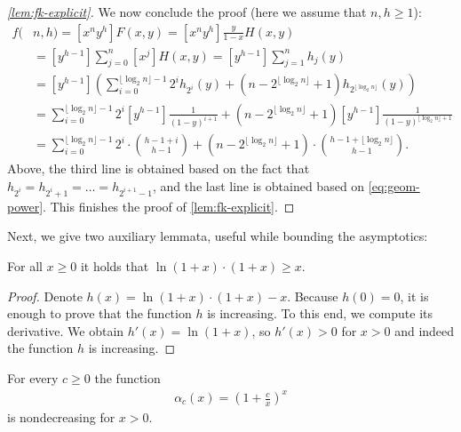 \documentclass[envcountsect,envcountsame]{llncs}
\newcommand{\fk}{f}
\newcommand{\Fk}{F}
\begin{document}
\begin{proof}[\cref{lem:fk-explicit}]
		We now conclude the proof (here we assume that $n,h\geq 1$):
		\begin{align*}
			\fk(&n, h)  = [x^n y^h] \Fk(x, y) = [x^n y^h] \frac{y}{1 - x} H(x, y)\\
			& = [y^{h - 1}] \sum_{j = 0}^n [x^j] H(x, y) = [y^{h - 1}] \sum_{j = 1}^n h_j(y)\\
			& = [y^{h - 1}] \left( \sum_{i = 0}^{\lfloor \log_2 n \rfloor - 1} 2^i h_{2^i}(y) + (n - 2^{\lfloor \log_2 n \rfloor} + 1)  h_{2^{\lfloor \log_2 n \rfloor}}(y) \right)\\
			& = \sum_{i = 0}^{\lfloor \log_2 n \rfloor - 1} 2^i [y^{h - 1}] \frac{1}{(1 - y)^{i + 1}}
				+ (n - 2^{\lfloor \log_2 n \rfloor} + 1) [y^{h - 1}] \frac{1}{(1 - y)^{\lfloor \log_2 n \rfloor + 1}}\\
			& = \sum_{i = 0}^{\lfloor \log_2 n \rfloor - 1} 2^i\cdot\binom{h - 1 + i}{h - 1} + (n - 2^{\lfloor \log_2 n \rfloor} + 1)\cdot\binom{h - 1 + \lfloor \log_2 n \rfloor}{h - 1}.
		\end{align*}
		Above, the third line is obtained based on the fact that $h_{2^i} = h_{2^i + 1} = \ldots = h_{2^{i + 1} - 1}$,
		and the last line is obtained based on \cref{eq:geom-power}.
		This finishes the proof of \cref{lem:fk-explicit}.
	\end{proof}

	Next, we give two auxiliary lemmata, useful while bounding the asymptotics:

	\begin{lemma}\label{lem:ineq1}
		For all $x\geq 0$ it holds that $\ln(1 + x) \cdot (1 + x) \geq x$.
	\end{lemma}

	\begin{proof}
		Denote $h(x) = \ln(1 + x) \cdot (1 + x) - x$.
		Because $h(0) = 0$, it is enough to prove that the function $h$ is increasing.
		To this end, we compute its derivative.
		We obtain $h'(x) = \ln(1 + x)$, so $h'(x) > 0$ for $x > 0$ and indeed the function $h$ is increasing.
	\end{proof}

	\begin{lemma}\label{lem:ineq2}
		For every $c\geq 0$ the function
		\begin{align*}
			\alpha_c(x) = \left(1 + \frac{c}{x} \right)^x
		\end{align*}
		is nondecreasing for $x > 0$.
	\end{lemma}
\end{document}
